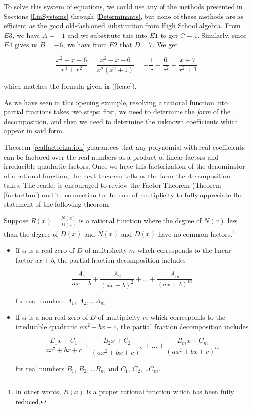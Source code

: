 \documentclass{ximera}
\begin{document}
To solve this system of equations, we could use any of the methods presented in Sections \ref{LinSystems} through \ref{Determinants}, but none of these methods are as efficient as the good old-fashioned substitution from High School algebra.  From $E3$, we have $A=-1$ and we substitute this into $E1$ to get $C = 1$.  Similarly, since $E4$ gives us $B=-6$, we have from $E2$ that $D = 7$.  We get

\[ \frac{x^2-x-6}{x^4+x^2} =  \frac{x^2-x-6}{x^2 \left(x^2+1\right)} = -\frac{1}{x} - \frac{6}{x^2} + \frac{x+7}{x^2+1} \] 

which matches the formula given in (\ref{fcalc}).  

As we have seen in this opening example, resolving a rational function into partial fractions takes two steps:  first, we need to determine the \textit{form} of the decomposition, and then we need to determine the unknown coefficients which appear in said form. 

Theorem \ref{realfactorization} guarantees that any polynomial with real coefficients can be factored over the real numbers as a product of linear factors and irreducible quadratic factors.  Once we have this factorization of the denominator of a rational function, the next theorem tells us the form the decomposition takes.  The reader is encouraged to review the Factor Theorem  (Theorem \ref{factorthm}) and its connection to the role of multiplicity to fully appreciate the statement of the following theorem.

 


\begin{theorem}  \label{pfdecomp} Suppose $R(x) = \frac{N(x)}{D(x)}$ is a rational function where the degree of $N(x)$ less than the degree of $D(x)$ and $N(x)$ and $D(x)$ have no common factors.\footnote{In other words, $R(x)$ is a proper rational function which has been fully reduced.}

\begin{itemize}

\item  If $\alpha$ is a real zero of $D$ of multiplicity $m$ which corresponds to the linear factor $ax+b$, the partial fraction decomposition includes

\[ \frac{A_1}{ax+b} + \frac{A_2}{(ax+b)^2} + \ldots + \frac{A_{m}}{(ax+b)^m} \]

for real numbers $A_1$, $A_2$, \ldots $A_{m}$.

\item  If $\alpha$ is a non-real zero of $D$ of multiplicity $m$ which corresponds to the irreducible quadratic $ax^2+bx+c$, the partial fraction decomposition includes  

\[ \frac{B_1x + C_1}{ax^2+bx+c} + \frac{B_2x + C_2}{\left(ax^2+bx+c\right)^2} + \ldots +\frac{B_{m}x + C_{m}}{\left(ax^2+bx+c\right)^m} \]

for real numbers $B_1$, $B_2$, \ldots $B_{m}$ and $C_1$, $C_2$, \ldots $C_{m}$. 

\end{itemize}


\end{theorem}
\end{document}

